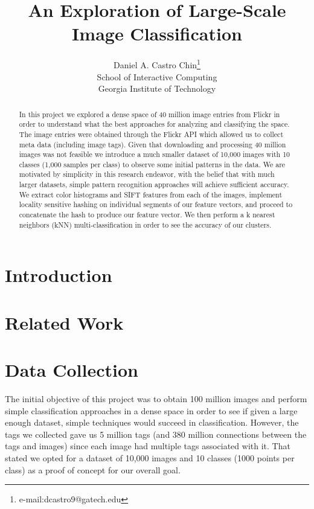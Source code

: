 \documentclass[conference]{acmsiggraph}
\title{An Exploration of Large-Scale Image Classification}
\author{Daniel A. Castro Chin\thanks{e-mail:dcastro9@gatech.edu}\\School of Interactive Computing\\Georgia Institute of Technology}
\begin{document}

\maketitle

\begin{abstract}

In this project we explored a dense space of 40 million image entries from Flickr in order to understand what the best approaches for analyzing and classifying the space. The image entries were obtained through the Flickr API which allowed us to collect meta data (including image tags). Given that downloading and processing 40 million images was not feasible we introduce a much smaller dataset of 10,000 images with 10 classes (1,000 samples per class) to observe some initial patterns in the data. We are motivated by simplicity in this research endeavor, with the belief that with much larger datasets, simple pattern recognition approaches will achieve sufficient accuracy. We extract color histograms and SIFT features from each of the images, implement locality sensitive hashing on individual segments of our feature vectors, and proceed to concatenate the hash to produce our feature vector. We then perform a k nearest neighbors (kNN) multi-classification in order to see the accuracy of our clusters.

\end{abstract}

\TOGlinkslist
\copyrightspace

\section{Introduction}


\section{Related Work}

\section{Data Collection}

The initial objective of this project was to obtain 100 million images and perform simple classification approaches in a dense space in order to see if given a large enough dataset, simple techniques would succeed in classification. However, the tags we collected gave us 5 million tags (and 380 million connections between the tags and images) since each image had multiple tags associated with it. That stated we opted for a dataset of 10,000 images and 10 classes (1000 points per class) as a proof of concept for our overall goal.
\end{document}
